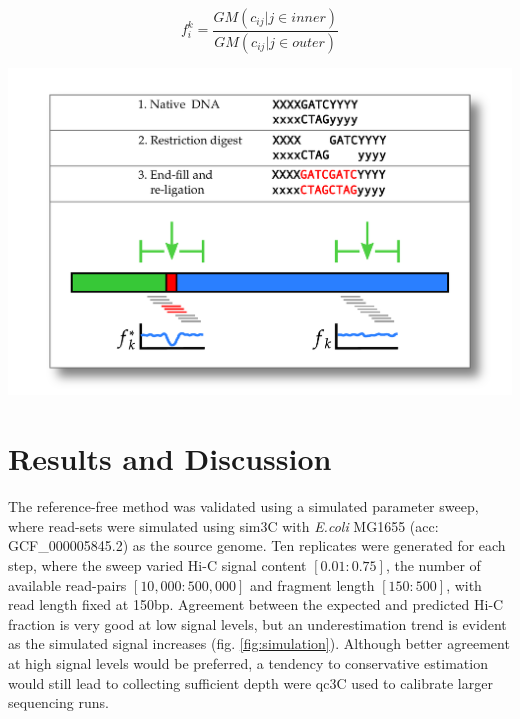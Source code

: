 \documentclass[a0,landscape]{a0poster}
\begin{document}
\begin{multicols}{4}
\begin{minipage}{0.8\linewidth}\vspace{1cm}
\begin{equation}\label{fig:eq1}
f^k_i=\frac{GM({c_{ij} | j \in inner})}{GM({c_{ij} | j \in outer})}
\end{equation}
\end{minipage}

\begin{minipage}{\linewidth}
\begin{center}\vspace{1cm}
\includegraphics[width=0.85\linewidth]{method-figure-bigger.pdf}
\label{fig:junction}
\end{center}\vspace{1cm}
\end{minipage}

\section*{Results and Discussion}

The reference-free method was validated using a simulated parameter sweep, where read-sets were simulated using sim3C \cite{DeMaere2018-gf} with \textit{E.coli} MG1655 (acc: GCF\_000005845.2) as the source genome. Ten replicates were generated for each step, where the sweep varied Hi-C signal content $[0.01 : 0.75]$, the number of available read-pairs $[10,000 : 500,000]$ and fragment length $[150 : 500]$, with read length fixed at 150bp. Agreement between the expected and predicted Hi-C fraction is very good at low signal levels, but an underestimation trend is evident as the simulated signal increases (fig. \ref{fig:simulation}). Although better agreement at high signal levels would be preferred, a tendency to conservative estimation would still lead to collecting sufficient depth were qc3C used to calibrate larger sequencing runs.


\end{multicols}
\end{document}
